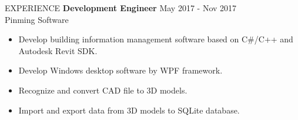 \documentclass{resume} %
\begin{document}
\begin{rSection}{EXPERIENCE}
\textbf{Development Engineer} \hfill May 2017 - Nov 2017\\
Pinming Software \hfill \textit{}
\begin{itemize}
  \itemsep -3pt {}
  \item Develop building information management software based on C\#/C++ and Autodesk Revit SDK.
  \item Develop Windows desktop software by WPF framework.
  \item Recognize and convert CAD file to 3D models.
  \item Import and export data from 3D models to SQLite database.
\end{itemize}

\end{rSection}
\end{document}
